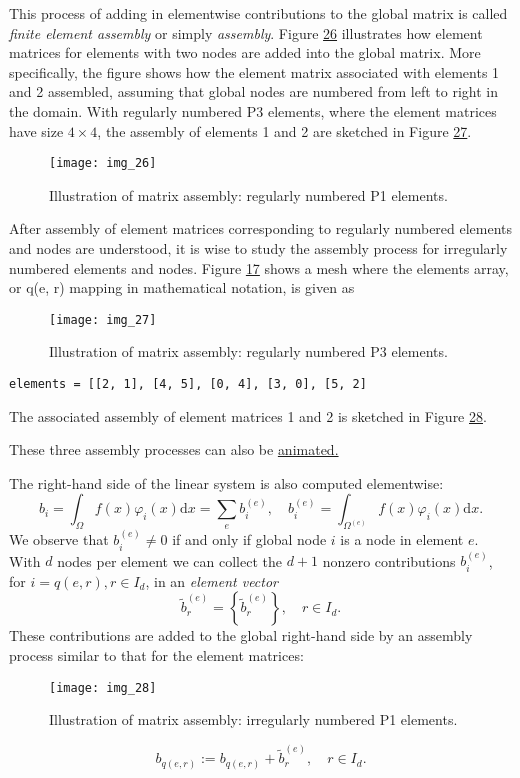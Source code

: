 \documentclass[../main.tex]{subfiles}
\begin{document}
	This process of adding in elementwise contributions to the global matrix is called \textit{finite element assembly} or simply \textit{assembly}. Figure \hyperref[fig:img_26]{26} illustrates how element matrices for elements with two nodes are added into the global matrix. More specifically, the figure shows how the element matrix associated with elements 1 and 2 assembled, assuming that global nodes are numbered from left to right in the domain. With regularly numbered P3 elements, where the element matrices have size $4 \times 4$, the assembly of elements 1 and 2 are sketched in Figure \hyperref[fig:img_27]{27}.
	\begin{figure}[H]
		\centering
		\texttt{[image: img\_26]}
		\caption{Illustration of matrix assembly: regularly numbered P1 elements.}
		\label{fig:img_26}
	\end{figure}
	
	After assembly of element matrices corresponding to regularly numbered
	elements and nodes are understood, it is wise to study the assembly process for
	irregularly numbered elements and nodes. Figure \hyperref[fig:img_17]{17} shows a mesh where the
	elements array, or q(e, r) mapping in mathematical notation, is given as
	\begin{figure}[H]
		\centering
		\texttt{[image: img\_27]}
		\caption{Illustration of matrix assembly: regularly numbered P3 elements.}
		\label{fig:img_27}
	\end{figure}
	
	\begin{lstlisting}[numbers=none]
		elements = [[2, 1], [4, 5], [0, 4], [3, 0], [5, 2]
	\end{lstlisting}
	The associated assembly of element matrices 1 and 2 is sketched in Figure \hyperref[fig:img_28]{28}. 
	
	These three assembly processes can also be \href{http://hplgit.github.io/INF5620/doc/pub/mov-fem/fe_assembly.html}{animated.}
	
	
	The right-hand side of the linear system is also computed elementwise:
	\begin{equation}\label{eqa59}
		b_{i}=\int_{\Omega} f(x) \varphi_{i}(x) \mathrm{d} x=\sum_{e} b_{i}^{(e)}, \quad b_{i}^{(e)}=\int_{\Omega^{(e)}} f(x) \varphi_{i}(x) \mathrm{d} x.
	\end{equation}
	We observe that $b_{i}^{(e)} \neq 0$ if and only if global node $i$ is a node in element $e$. With $d$ nodes per element we can collect the $d+1$ nonzero contributions $b_{i}^{(e)}$, for $i=q(e, r), r \in I_{d}$, in an \textit{element vector}
	$$
	\tilde{b}_{r}^{(e)}=\left\{\tilde{b}_{r}^{(e)}\right\}, \quad r \in I_{d} .
	$$
	These contributions are added to the global right-hand side by an assembly process similar to that for the element matrices:
	\begin{figure}[H]
		\centering
		\texttt{[image: img\_28]}
		\caption{Illustration of matrix assembly: irregularly numbered P1 elements.}
		\label{fig:img_28}
	\end{figure}
	\begin{equation}\label{eqa60}
		b_{q(e, r)}:=b_{q(e, r)}+\tilde{b}_{r}^{(e)}, \quad r \in I_{d}.
	\end{equation}
\end{document}
